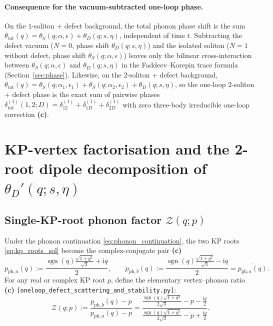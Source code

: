 \documentclass[11pt,a4paper]{article}
\newcommand{\ii}{\mathrm{i}}
\newcommand{\sgn}{\operatorname{sgn}}
\begin{document}
\paragraph{Consequence for the vacuum-subtracted one-loop phase.}
On the $1$-soliton + defect background, the total phonon phase shift is the sum
$\theta_{\mathrm{tot}}(q) = \theta_S(q;\alpha,\epsilon) + \theta_D(q;s,\eta)$,
independent of time $t$. Subtracting the defect vacuum ($N=0$, phase shift
$\theta_D(q;s,\eta)$) and the isolated soliton ($N=1$ without defect, phase shift
$\theta_S(q;\alpha,\epsilon)$) leaves only the bilinear cross-interaction
between $\theta_S(q;\alpha,\epsilon)$ and $\theta_D(q;s,\eta)$ in the
Faddeev--Korepin trace formula (Section~\ref{sec:phase}). Likewise, on the
$2$-soliton + defect background,
$\theta_{\mathrm{tot}}(q) = \theta_S(q;\alpha_1,\epsilon_1) + \theta_S(q;\alpha_2,\epsilon_2) + \theta_D(q;s,\eta)$,
so the one-loop $2$-soliton + defect phase is the exact sum of pairwise
phases $\delta_{\mathrm{tot}}^{(1)}(1,2;D) = \delta_{12}^{(1)} + \delta_{1D}^{(1)} + \delta_{2D}^{(1)}$
with zero three-body irreducible one-loop correction \textbf{(c)}.

\section{KP-vertex factorisation and the 2-root dipole decomposition of $\theta_D'(q;s,\eta)$}
\label{sec:dipole}

\subsection{Single-KP-root phonon factor $\mathcal{Z}(q;p)$}

Under the phonon continuation \eqref{eq:phonon_continuation}, the two KP roots
\eqref{eq:kp_roots_sol} become the complex-conjugate pair \textbf{(c)}
\begin{equation}\label{eq:p_ph}
  p_{\mathrm{ph},a}(q) := \frac{\sgn(q)\frac{\sqrt{1+q^2}}{\sqrt{3}} + \ii q}{2}, \qquad
  p_{\mathrm{ph},b}(q) := \frac{\sgn(q)\frac{\sqrt{1+q^2}}{\sqrt{3}} - \ii q}{2} = \overline{p_{\mathrm{ph},a}(q)}.
\end{equation}
For any real or complex KP root $p$, define the elementary vertex--phonon ratio
\textbf{(c)} \texttt{[oneloop\_defect\_scattering\_and\_stability.py]}:
\begin{equation}\label{eq:Z_vertex}
  \mathcal{Z}(q;p) := \frac{p_{\mathrm{ph},b}(q) - p}{p_{\mathrm{ph},a}(q) - p}
  = \frac{\frac{\sgn(q)\sqrt{1+q^2}}{2\sqrt{3}} - p - \frac{\ii q}{2}}
         {\frac{\sgn(q)\sqrt{1+q^2}}{2\sqrt{3}} - p + \frac{\ii q}{2}}.
\end{equation}
\end{document}
